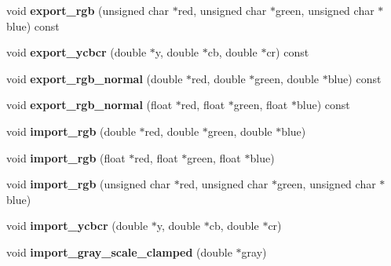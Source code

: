 \begin{DoxyCompactItemize}
\item 
\mbox{\label{classbitmap__image_a12267e033fc2803374b720ab3197c8ab}} 
void {\bfseries export\+\_\+rgb} (unsigned char $\ast$red, unsigned char $\ast$green, unsigned char $\ast$blue) const
\item 
\mbox{\label{classbitmap__image_a8f436285b6db0c31ca97fc7930b9be54}} 
void {\bfseries export\+\_\+ycbcr} (double $\ast$y, double $\ast$cb, double $\ast$cr) const
\item 
\mbox{\label{classbitmap__image_a4b29506ac6a559aec5d65c44e4b11cd4}} 
void {\bfseries export\+\_\+rgb\+\_\+normal} (double $\ast$red, double $\ast$green, double $\ast$blue) const
\item 
\mbox{\label{classbitmap__image_a7fe5e72288c9de691b23f07201ecefad}} 
void {\bfseries export\+\_\+rgb\+\_\+normal} (float $\ast$red, float $\ast$green, float $\ast$blue) const
\item 
\mbox{\label{classbitmap__image_a908b73c5b9ae5c000c18884dd007830b}} 
void {\bfseries import\+\_\+rgb} (double $\ast$red, double $\ast$green, double $\ast$blue)
\item 
\mbox{\label{classbitmap__image_a315ba5ea699b805de594ae555409b168}} 
void {\bfseries import\+\_\+rgb} (float $\ast$red, float $\ast$green, float $\ast$blue)
\item 
\mbox{\label{classbitmap__image_a2dddd93965c31509104f89284e26b010}} 
void {\bfseries import\+\_\+rgb} (unsigned char $\ast$red, unsigned char $\ast$green, unsigned char $\ast$blue)
\item 
\mbox{\label{classbitmap__image_a8f46f8a19f71e3432f447c9fb558cd5f}} 
void {\bfseries import\+\_\+ycbcr} (double $\ast$y, double $\ast$cb, double $\ast$cr)
\item 
\mbox{\label{classbitmap__image_aa7765f0a1fcba6a88f40bfeb51c8efce}} 
void {\bfseries import\+\_\+gray\+\_\+scale\+\_\+clamped} (double $\ast$gray)
\item 
\mbox{\label{classbitmap__image_a8409131d9ab6a1e3a46637a95efc21aa}} 

\end{DoxyCompactItemize}
